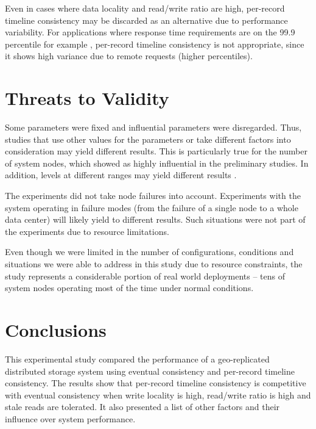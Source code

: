 \documentclass[man,floatsintext,12pt]{apa6}
\begin{document}
Even in cases where data locality and read/write ratio are high, per-record
timeline consistency may be discarded as an alternative due to performance
variability. For applications where response time requirements are on the 99.9
percentile for example \parencite{DeCandia2007}, per-record timeline
consistency is not appropriate, since it shows high variance due to remote
requests (higher percentiles).

\label{threats_to_validity}
\section{Threats to Validity}

Some parameters were fixed and influential parameters were disregarded. Thus,
studies that use other values for the parameters or take different factors into
consideration may yield different results. This is particularly true for the
number of system nodes, which showed as highly influential in the preliminary
studies. In addition, levels at different ranges may yield different results
\parencite{Jain1991}.

The experiments did not take node failures into account. Experiments with the
system operating in failure modes (from the failure of a single node to a
whole data center) will likely yield to different results. Such situations were
not part of the experiments due to resource limitations.

Even though we were limited in the number of configurations, conditions and
situations we were able to address in this study due to resource constraints,
the study represents a considerable portion of real world deployments -- tens
of system nodes operating most of the time under normal conditions.

\section{Conclusions}

This experimental study compared the performance of a geo-replicated
distributed storage system using eventual consistency and per-record timeline
consistency. The results show that per-record timeline consistency is
competitive with eventual consistency when write locality is high, read/write
ratio is high and stale reads are tolerated. It also presented a list of other
factors and their influence over system performance.
\end{document}
